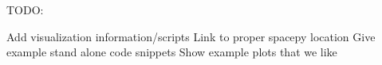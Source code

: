 TODO:

Add visualization information/scripts
Link to proper spacepy location
Give example stand alone code snippets
Show example plots that we like

